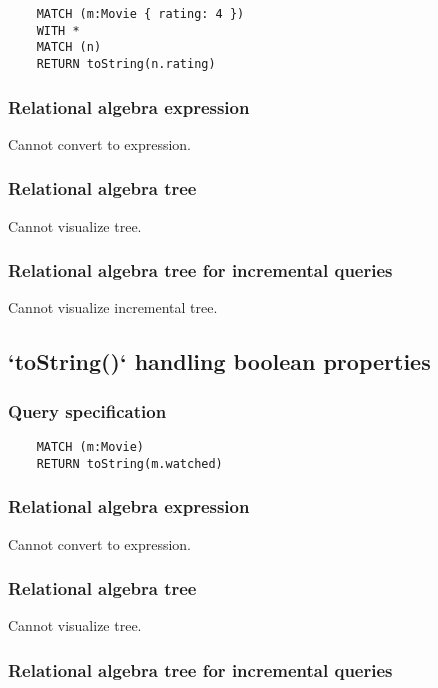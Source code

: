 	\begin{lstlisting}
	MATCH (m:Movie { rating: 4 })
	WITH *
	MATCH (n)
	RETURN toString(n.rating)
	\end{lstlisting}


	\subsubsection*{Relational algebra expression}

	Cannot convert to expression.

	\subsubsection*{Relational algebra tree}

	Cannot visualize tree.

	\subsubsection*{Relational algebra tree for incremental queries}

	Cannot visualize incremental tree.
	\subsection{`toString()` handling boolean properties}

	\subsubsection*{Query specification}

	\begin{lstlisting}
	MATCH (m:Movie)
	RETURN toString(m.watched)
	\end{lstlisting}


	\subsubsection*{Relational algebra expression}

	Cannot convert to expression.

	\subsubsection*{Relational algebra tree}

	Cannot visualize tree.

	\subsubsection*{Relational algebra tree for incremental queries}

